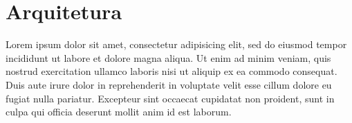 \section{Arquitetura}


Lorem ipsum dolor sit amet, consectetur adipisicing elit, sed do eiusmod
tempor incididunt ut labore et dolore magna aliqua. Ut enim ad minim veniam,
quis nostrud exercitation ullamco laboris nisi ut aliquip ex ea commodo
consequat. Duis aute irure dolor in reprehenderit in voluptate velit esse
cillum dolore eu fugiat nulla pariatur. Excepteur sint occaecat cupidatat non
proident, sunt in culpa qui officia deserunt mollit anim id est laborum.